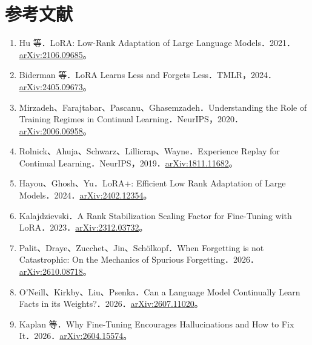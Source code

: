 \documentclass[UTF8,fontset=fandol,10pt,a4paper]{ctexart}
\begin{document}
\section*{参考文献}
\begin{enumerate}
\item
Hu 等．LoRA: Low-Rank Adaptation of Large Language Models．2021．\href{https://arxiv.org/abs/2106.09685}{arXiv:2106.09685}。



\item
Biderman 等．LoRA Learns Less and Forgets Less．TMLR，2024．\href{https://arxiv.org/abs/2405.09673}{arXiv:2405.09673}。



\item
Mirzadeh、Farajtabar、Pascanu、Ghasemzadeh．Understanding the Role of Training Regimes in Continual Learning．NeurIPS，2020．\href{https://arxiv.org/abs/2006.06958}{arXiv:2006.06958}。



\item
Rolnick、Ahuja、Schwarz、Lillicrap、Wayne．Experience Replay for Continual Learning．NeurIPS，2019．\href{https://arxiv.org/abs/1811.11682}{arXiv:1811.11682}。



\item
Hayou、Ghosh、Yu．LoRA+: Efficient Low Rank Adaptation of Large Models．2024．\href{https://arxiv.org/abs/2402.12354}{arXiv:2402.12354}。



\item
Kalajdzievski．A Rank Stabilization Scaling Factor for Fine-Tuning with LoRA．2023．\href{https://arxiv.org/abs/2312.03732}{arXiv:2312.03732}。



\item
Palit、Draye、Zucchet、Jin、Schölkopf．When Forgetting is not Catastrophic: On the Mechanics of Spurious Forgetting．2026．\href{https://arxiv.org/abs/2610.08718}{arXiv:2610.08718}。



\item
O'Neill、Kirkby、Liu、Psenka．Can a Language Model Continually Learn Facts in its Weights?．2026．\href{https://arxiv.org/abs/2607.11020}{arXiv:2607.11020}。



\item
Kaplan 等．Why Fine-Tuning Encourages Hallucinations and How to Fix It．2026．\href{https://arxiv.org/abs/2604.15574}{arXiv:2604.15574}。




\end{enumerate}
\end{document}
